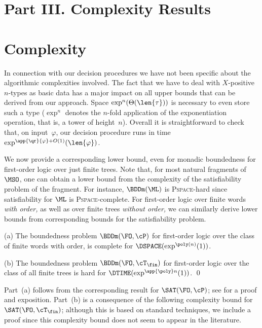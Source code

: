 \documentclass{LMCS}
\begin{document}
\bigskip
\section*{Part III. Complexity Results}

\medskip
\section{Complexity}
\label{sect:complexity}
\label{sect:start III}
\label{sect:end III}

In connection with our decision procedures we have not been
specific about the algorithmic complexities involved.
The fact that we have to deal with $X$-positive $n$-types
as basic data has a major impact on all upper bounds that
can be derived from our approach.
Space $\exp^n(\Theta(\len{\tau}))$ is necessary to even
store such a type ($\exp^n$ denotes
the $n$-fold application of the exponentiation operation,
that is, a tower of height~$n$).
Overall it is straightforward to check that, on input~$\varphi$,
our decision procedure runs
in time $\exp^{\app{\qr}{\varphi} + O(1)}(\len{\varphi})$.

We now provide a corresponding lower bound,
even for monadic boundedness for first-order logic over just finite trees.
Note that, for most natural fragments of $\MSO$,
one can obtain a lower bound from the complexity of the
satisfiability problem of the fragment.
For instance, $\BDDm(\ML)$ is \textsc{Pspace}-hard
since satisfiability for $\ML$ is \textsc{Pspace}-complete.
For first-order logic over finite words \emph{with order,}
as well as over finite trees \emph{without order,}
we can similarly derive lower bounds from corresponding 
bounds for the satisfiability problem.

\begin{thm}\label{theo:lower complexity bound}
\textup{(a)}
The boundedness problem $\BDDm(\FO,\cP)$ for 
first-order logic over the class of finite words with order, 
is complete for $\DSPACE(\exp^{\poly(n)}(1))$.

\textup{(b)}
The boundedness problem 
$\BDDm(\FO,\cT_\fin)$ for first-order logic over the class
of all finite trees is hard for $\DTIME(\exp^{\app{\poly}n}(1))$.
\qed\end{thm}

Part~(a) follows from the corresponding 
result for $\SAT(\FO,\cP)$\?;
see \cite{Reinhardt02} for a proof and exposition.
Part~(b) is a consequence of the following complexity bound for
$\SAT(\FO,\cT_\fin)$\?; although this is based on standard techniques,
we include a proof since this complexity bound does not seem to appear
in the literature.
\end{document}
